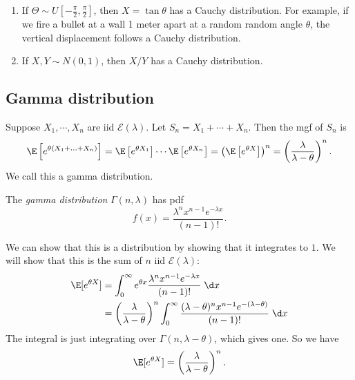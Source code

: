 \documentclass[a4paper]{article}
\begin{document}
\begin{eg}\leavevmode
  \begin{enumerate}
    \item If $\Theta\sim U[-\frac{\pi}{2}, \frac{\pi}{2}]$, then $X = \tan \theta$ has a Cauchy distribution. For example, if we fire a bullet at a wall 1 meter apart at a random random angle $\theta$, the vertical displacement follows a Cauchy distribution.
      \begin{center}
      \end{center}
    \item If $X, Y\sim N(0, 1)$, then $X/Y$ has a Cauchy distribution.
  \end{enumerate}
\end{eg}

\subsection{Gamma distribution}
Suppose $X_1, \cdots, X_n$ are iid $\mathcal{E}(\lambda)$. Let $S_n = X_1 + \cdots + X_n$. Then the mgf of $S_n$ is
\[
  \E\left[e^{\theta(X_1 + \ldots + X_n)}\right] = \E\left[e^{\theta X_1}\right]\cdots \E\left[e^{\theta X_n}\right] = \left(\E\left[e^{\theta X}\right]\right)^n = \left(\frac{\lambda}{\lambda - \theta}\right)^n.
\]
We call this a gamma distribution.

\begin{defi}
  The \emph{gamma distribution} $\Gamma(n, \lambda)$ has pdf
  \[
    f(x) = \frac{\lambda^n x^{n - 1}e^{-\lambda x}}{(n - 1)!}.
  \]
\end{defi}
We can show that this is a distribution by showing that it integrates to $1$.
We will show that this is the sum of $n$ iid $\mathcal{E}(\lambda)$:
\begin{align*}
  \E[e^{\theta X}] &= \int_0^\infty e^{\theta x} \frac{\lambda^n x^{n - 1}e^{-\lambda x}}{(n - 1)!}\;\d x\\
  &= \left(\frac{\lambda}{\lambda - \theta}\right)^n \int_0^\infty \frac{(\lambda - \theta)^n x^{n - 1}e^{-(\lambda - \theta)}}{(n - 1)!}\;\d x
\end{align*}
The integral is just integrating over $\Gamma(n, \lambda - \theta)$, which gives one. So we have
\[
  \E[e^{\theta X}]= \left(\frac{\lambda}{\lambda - \theta}\right)^n.
\]
\end{document}
